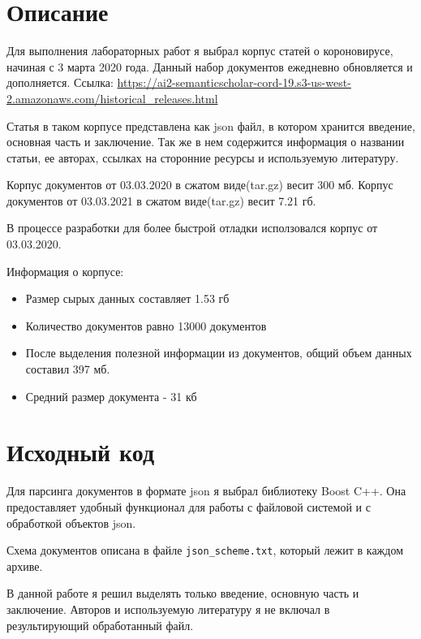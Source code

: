 \section{Описание}
Для выполнения лабораторных работ я выбрал корпус статей о короновирусе, начиная с 3 марта 2020 года. Данный набор документов ежедневно обновляется и дополняется. Ссылка: \url{https://ai2-semanticscholar-cord-19.s3-us-west-2.amazonaws.com/historical_releases.html}

Статья в таком корпусе представлена как json файл, в котором хранится введение, основная часть и заключение. Так же в нем содержится информация о названии статьи, ее авторах, ссылках на сторонние ресурсы и используемую литературу. 

Корпус документов от 03.03.2020 в сжатом виде(tar.gz) весит 300 мб.
Корпус документов от 03.03.2021 в сжатом виде(tar.gz) весит 7.21 гб.

В процессе разработки для более быстрой отладки исползовался корпус от 03.03.2020. 

Информация о корпусе:

\begin{itemize}
    \item Размер сырых данных составляет 1.53 гб
    \item Количество документов равно 13000 документов
    \item После выделения полезной информации из документов, общий объем данных составил 397 мб.
    \item Средний размер документа - 31 кб
\end{itemize}

\pagebreak

\section{Исходный код}
Для парсинга документов в формате json я выбрал библиотеку Boost C++. Она предоставляет удобный функционал для работы с файловой системой и с обработкой объектов json. 

Схема документов описана в файле \verb|json_scheme.txt|, который лежит в каждом архиве.

В данной работе я решил выделять только введение, основную часть и заключение. Авторов и используемую литературу я не включал в результирующий обработанный файл.

